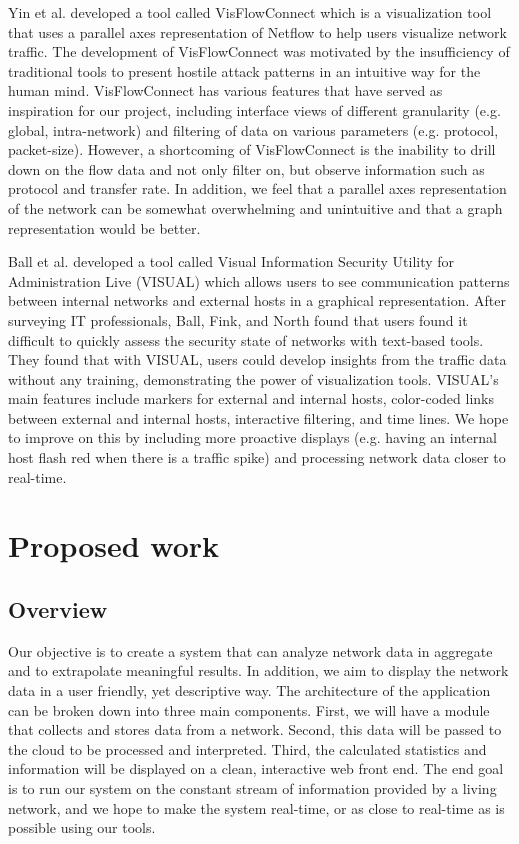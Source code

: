 \documentclass{sig-alternate}
\begin{document}
Yin et al.\cite{Yin04} developed a tool called VisFlowConnect which is a
visualization tool that uses a parallel axes representation of Netflow to help
users visualize network traffic. The development of VisFlowConnect was motivated
by the insufficiency of traditional tools to present hostile attack patterns in
an intuitive way for the human mind. VisFlowConnect has various features that
have served as inspiration for our project, including interface views of
different granularity (e.g. global, intra-network) and filtering of data on
various parameters (e.g. protocol, packet-size). However, a shortcoming of
VisFlowConnect is the inability to drill down on the flow data and not only
filter on, but observe information such as protocol and transfer rate. In
addition, we feel that a parallel axes representation of the network can be
somewhat overwhelming and unintuitive and that a graph representation would be
better.

Ball et al.\cite{Ball04} developed a tool called Visual Information Security
Utility for Administration Live (VISUAL) which allows users to see communication
patterns between internal networks and external hosts in a graphical
representation. After surveying IT professionals, Ball, Fink, and North found
that users found it difficult to quickly assess the security state of networks
with text-based tools. They found that with VISUAL, users could develop insights
from the traffic data without any training, demonstrating the power of
visualization tools. VISUAL's main features include markers for external and
internal hosts, color-coded links between external and internal hosts,
interactive filtering, and time lines. We hope to improve on this by including
more proactive displays (e.g. having an internal host flash red when there is a
traffic spike) and processing network data closer to real-time.

\section{Proposed work}

\subsection{Overview}

Our objective is to create a system that can analyze network data in aggregate
and to extrapolate meaningful results. In addition, we aim to display the
network data in a user friendly, yet descriptive way. The architecture of the
application can be broken down into three main components. First, we will have a
module that collects and stores data from a network. Second, this data will be
passed to the cloud to be processed and interpreted. Third, the calculated
statistics and information will be displayed on a clean, interactive web front
end. The end goal is to run our system on the constant stream of information
provided by a living network, and we hope to make the system real-time, or as
close to real-time as is possible using our tools.
\end{document}
